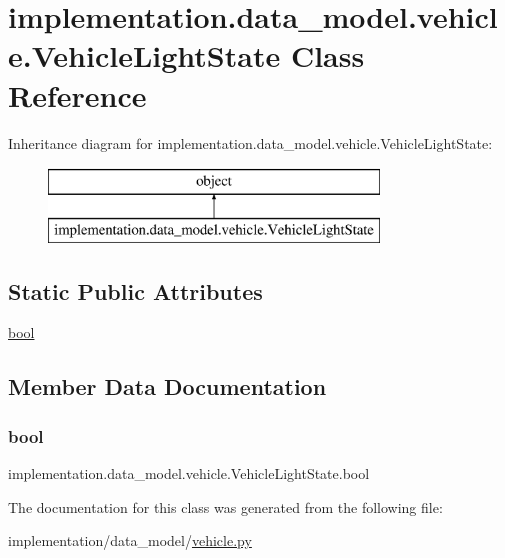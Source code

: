 \hypertarget{classimplementation_1_1data__model_1_1vehicle_1_1_vehicle_light_state}{}\section{implementation.\+data\+\_\+model.\+vehicle.\+Vehicle\+Light\+State Class Reference}
\label{classimplementation_1_1data__model_1_1vehicle_1_1_vehicle_light_state}
Inheritance diagram for implementation.\+data\+\_\+model.\+vehicle.\+Vehicle\+Light\+State\+:\begin{figure}[H]
\begin{center}
\leavevmode
\includegraphics[height=2.000000cm]{classimplementation_1_1data__model_1_1vehicle_1_1_vehicle_light_state}
\end{center}
\end{figure}
\subsection*{Static Public Attributes}
\begin{DoxyCompactItemize}
\item 
\hyperlink{classimplementation_1_1data__model_1_1vehicle_1_1_vehicle_light_state_ade0540c4d3d9595d356a3ab6d11f81b9}{bool}
\end{DoxyCompactItemize}


\subsection{Member Data Documentation}
\mbox{\label{classimplementation_1_1data__model_1_1vehicle_1_1_vehicle_light_state_ade0540c4d3d9595d356a3ab6d11f81b9}} 
\subsubsection{\texorpdfstring{bool}{bool}}
{\footnotesize\ttfamily implementation.\+data\+\_\+model.\+vehicle.\+Vehicle\+Light\+State.\+bool\hspace{0.3cm}{\ttfamily [static]}}



The documentation for this class was generated from the following file\+:\begin{DoxyCompactItemize}
\item 
implementation/data\+\_\+model/\hyperlink{vehicle_8py}{vehicle.\+py}\end{DoxyCompactItemize}
